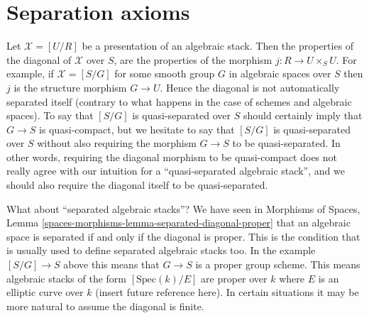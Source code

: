 \section{Separation axioms}
\label{section-separated}

\noindent
Let $\mathcal{X} = [U/R]$ be a presentation of an algebraic stack.
Then the properties of the diagonal of $\mathcal{X}$ over $S$, are
the properties of the morphism $j : R \to U \times_S U$. For example,
if $\mathcal{X} = [S/G]$ for some smooth group $G$ in algebraic spaces
over $S$ then $j$ is the structure morphism $G \to U$. Hence the diagonal
is not automatically separated itself (contrary to what happens in the
case of schemes and algebraic spaces). To say that $[S/G]$ is quasi-separated
over $S$ should certainly imply that $G \to S$ is quasi-compact, but we
hesitate to say that $[S/G]$ is quasi-separated over $S$ without also
requiring the morphism $G \to S$ to be quasi-separated. In other words,
requiring the diagonal morphism to be quasi-compact does not really agree
with our intuition for a ``quasi-separated algebraic stack'', and we should
also require the diagonal itself to be quasi-separated.

\medskip\noindent
What about ``separated algebraic stacks''? We have seen in
Morphisms of Spaces,
Lemma \ref{spaces-morphisms-lemma-separated-diagonal-proper}
that an algebraic space is separated if and only if the diagonal is proper.
This is the condition that is usually used to define separated algebraic
stacks too. In the example $[S/G] \to S$ above this means that $G \to S$
is a proper group scheme. This means algebraic stacks of the form
$[\text{Spec}(k)/E]$ are proper over $k$ where $E$ is an elliptic curve
over $k$ (insert future reference here). In certain situations it may be
more natural to assume the diagonal is finite.

